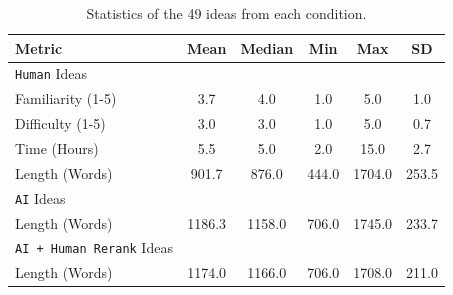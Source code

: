 




\begin{table}[t]
\centering
\small 
\begin{tabular}{l c c c c c} 
 \hline
 Metric & Mean & Median & Min & Max & SD \\ 
 \hline
 \texttt{Human} Ideas  \\
 Familiarity (1-5) & 3.7 & 4.0 & 1.0 & 5.0 & 1.0 \\
 Difficulty (1-5) & 3.0 & 3.0 & 1.0 & 5.0 & 0.7 \\
 Time (Hours) & 5.5 & 5.0 & 2.0 & 15.0 & 2.7 \\
 Length (Words) & 901.7 & 876.0 & 444.0 & 1704.0 & 253.5 \\
 \hline
 \texttt{AI} Ideas \\
 Length (Words) & 1186.3 & 1158.0 & 706.0 & 1745.0 & 233.7 \\
 \hline 
 \texttt{AI + Human Rerank} Ideas \\
 Length (Words) & 1174.0 & 1166.0 & 706.0 & 1708.0 & 211.0 \\
 \hline
\end{tabular}
\caption{Statistics of the 49 ideas from each condition.}
\label{table:idea_statistics}
\end{table}



